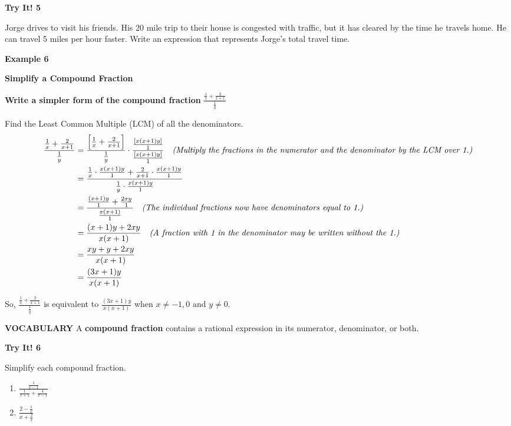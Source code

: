\documentclass{article}
\newenvironment{concept-box}{}{}
\newenvironment{example}[1]{\textbf{Example #1}\par}{\par}
\newenvironment{tryit}[1]{\textbf{Try It! #1}\par}{\par}
\begin{document}
\begin{tryit}{5}
Jorge drives to visit his friends. His 20 mile trip to their house is congested with traffic, but it has cleared by the time he travels home. He can travel 5 miles per hour faster. Write an expression that represents Jorge's total travel time.
\end{tryit}

\begin{example}{6}
\textbf{Simplify a Compound Fraction}

\textbf{Write a simpler form of the compound fraction} $\frac{\frac{1}{x} + \frac{2}{x + 1}}{\frac{1}{y}}$

Find the Least Common Multiple (LCM) of all the denominators.
\begin{align*}
\frac{\frac{1}{x} + \frac{2}{x + 1}}{\frac{1}{y}} &= \frac{\left[ \frac{1}{x} + \frac{2}{x + 1} \right]}{\frac{1}{y}} \cdot \frac{\frac{[x(x + 1)y]}{1}}{\frac{[x(x + 1)y]}{1}} \quad \text{\textit{(Multiply the fractions in the numerator and the denominator by the LCM over 1.)}} \\
&= \frac{\frac{1}{x} \cdot \frac{x(x + 1)y}{1} + \frac{2}{x + 1} \cdot \frac{x(x + 1)y}{1}}{\frac{1}{y} \cdot \frac{x(x + 1)y}{1}} \\
&= \frac{\frac{(x + 1)y}{1} + \frac{2xy}{1}}{\frac{x(x + 1)}{1}} \quad \text{\textit{(The individual fractions now have denominators equal to 1.)}} \\
&= \frac{(x + 1)y + 2xy}{x(x + 1)} \quad \text{\textit{(A fraction with 1 in the denominator may be written without the 1.)}} \\
&= \frac{xy + y + 2xy}{x(x + 1)} \\
&= \frac{(3x + 1)y}{x(x + 1)}
\end{align*}

So, $\frac{\frac{1}{x} + \frac{2}{x + 1}}{\frac{1}{y}}$ is equivalent to $\frac{(3x + 1)y}{x(x + 1)}$ when $x \neq -1, 0 \text{ and } y \neq 0$.
\end{example}

\begin{concept-box}
\textbf{VOCABULARY}
A \textbf{compound fraction} contains a rational expression in its numerator, denominator, or both.
\end{concept-box}

\begin{tryit}{6}
Simplify each compound fraction.
\begin{enumerate}
    \item[\textbf{a.}] $\frac{\frac{1}{x - 1}}{\frac{1}{x + 1} + \frac{4}{x - 1}}$
    \item[\textbf{b.}] $\frac{2 - \frac{1}{x}}{x + \frac{2}{x}}$
\end{enumerate}
\end{tryit}
\end{document}
